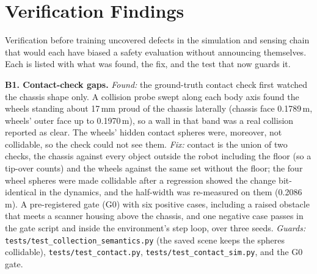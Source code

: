 \documentclass[sensors,article,submit,moreauthors]{Definitions/mdpi}
\begin{document}
\section{Verification Findings}\label{app:verification}

Verification before training uncovered defects in the simulation and sensing chain that would each have biased a safety evaluation without announcing themselves. Each is listed with what was found, the fix, and the test that now guards it.

\textbf{B1. Contact-check gaps.}
\emph{Found:} the ground-truth contact check first watched the chassis shape only. A collision probe swept along each body axis found the wheels standing about 17\,mm proud of the chassis laterally (chassis face 0.1789\,m, wheels' outer face up to 0.1970\,m), so a wall in that band was a real collision reported as clear. The wheels' hidden contact spheres were, moreover, not collidable, so the check could not see them.
\emph{Fix:} contact is the union of two checks, the chassis against every object outside the robot including the floor (so a tip-over counts) and the wheels against the same set without the floor; the four wheel spheres were made collidable after a regression showed the change bit-identical in the dynamics, and the half-width was re-measured on them (0.2086\,m). A pre-registered gate (G0) with six positive cases, including a raised obstacle that meets a scanner housing above the chassis, and one negative case passes in the gate script and inside the environment's step loop, over three seeds.
\emph{Guards:} \texttt{tests/test\_collection\_semantics.py} (the saved scene keeps the spheres collidable), \texttt{tests/test\_contact.py}, \texttt{tests/test\_contact\_sim.py}, and the G0 gate.
\end{document}

